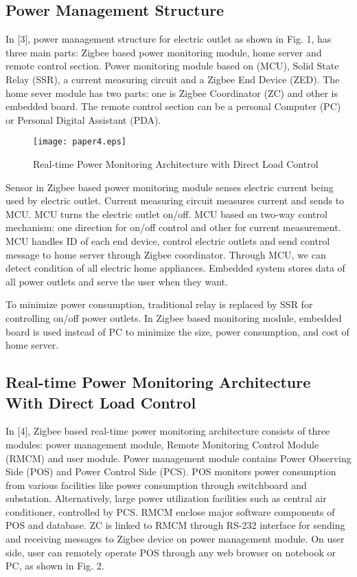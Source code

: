 \documentclass[10pt, conference, compsocconf]{IEEEtran}
\begin{document}
\subsection{Power Management Structure}
In [3], power management structure for electric outlet as shown in Fig. 1, has three main parts: Zigbee based power monitoring module, home server and remote control section. Power monitoring module based on (MCU), Solid State Relay (SSR), a current measuring circuit and a Zigbee End Device (ZED). The home sever module has two parts: one is Zigbee Coordinator (ZC) and other is embedded board. The remote control section can be a personal Computer (PC) or Personal Digital Assistant (PDA).

\begin{figure*}[t]
\centering
  \texttt{[image: paper4.eps]}
  \caption{Real-time Power Monitoring Architecture with Direct Load Control}
\end{figure*}

Sensor in Zigbee based power monitoring module senses electric current being used by electric outlet. Current measuring circuit measures current and sends to MCU. MCU turns the electric outlet on/off. MCU based on two-way control mechanism: one direction for on/off control and other for current measurement. MCU handles ID of each end device, control electric outlets and send control message to home server through Zigbee coordinator. Through MCU, we can detect condition of all electric home appliances. Embedded system stores data of all power outlets and serve the user when they want.

To minimize power consumption, traditional relay is replaced by SSR for controlling on/off power outlets. In Zigbee based monitoring module, embedded board is used instead of PC to minimize the size, power consumption, and cost of home server.

\subsection{Real-time Power Monitoring Architecture With Direct Load Control}
In [4], Zigbee based real-time power monitoring architecture consists of three modules: power management module, Remote Monitoring Control Module (RMCM) and user module. Power management module contains Power Observing Side (POS) and Power Control Side (PCS). POS monitors power consumption from various facilities like power consumption through switchboard and substation. Alternatively, large power utilization facilities such as central air conditioner, controlled by PCS. RMCM enclose major software components of POS and database. ZC is linked to RMCM through RS-232 interface for sending and receiving messages to Zigbee device on power management module. On user side, user can remotely operate POS through any web browser on notebook or PC, as shown in Fig. 2.
\end{document}
